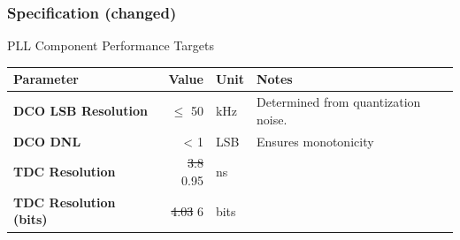 \documentclass[t, screen, aspectratio=43]{beamer}
\begin{document}
\begin{frame}
	\frametitle{Specification \color{red}(changed)}
	\begin{block}{PLL Component Performance Targets}
		\scriptsize
		\begin{table}[h!]
			\centering
			\def\arraystretch{1.5}		
			\setlength\arrayrulewidth{0.75pt}
			\setlength{\tabcolsep}{1em} %
			\begin{tabular}{|l|r|l|l|}
				\hline 
				\rule[-1ex]{0pt}{2.5ex} \cellcolor{gray!40}\textbf{Parameter} & \cellcolor{gray!40}\textbf{Value} & \cellcolor{gray!40}\textbf{Unit }& \cellcolor{gray!40}\textbf{Notes}\\ 
				\hline 
				\rule[-1ex]{0pt}{2.5ex} \textbf{DCO LSB Resolution}  & $\leq$ 50  & kHz & Determined from quantization noise.\\ 
				\hline 
				\rule[-1ex]{0pt}{2.5ex} \textbf{DCO DNL} & < 1 & LSB & Ensures monotonicity \\ 
				\hline 
				\rule[-1ex]{0pt}{2.5ex} \color{red}\textbf{TDC Resolution} & \sout{3.8} \color{red} 0.95  & \color{red}ns & \\ 
				\hline 
				\rule[-1ex]{0pt}{2.5ex} \color{red}\textbf{TDC Resolution (bits)} & \sout{4.03} \color{red} 6 &\color{red}bits & \\ 
				\hline 
			\end{tabular} 
		\end{table}   
	\end{block}    
\end{frame}

\end{document}
